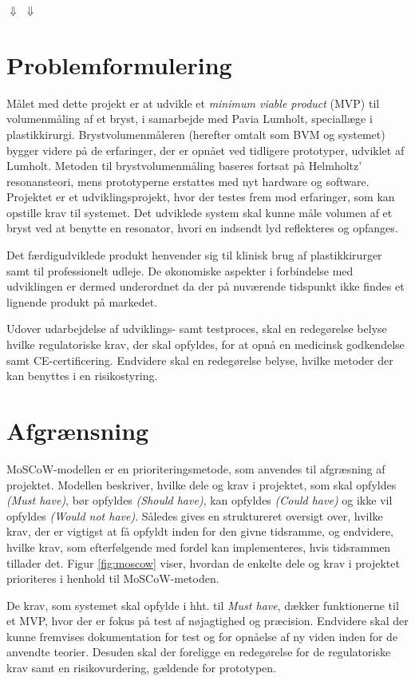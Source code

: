 \Wudl
$\Downarrow$
\Wudled
$\Downarrow$
\W
\vspace{5mm}  

\section{Problemformulering}
Målet med dette projekt er at udvikle et \textit{minimum viable product} (MVP) til volumenmåling af et bryst, i samarbejde med Pavia Lumholt, speciallæge i plastikkirurgi. Brystvolumenmåleren (herefter omtalt som BVM og systemet) bygger videre på de erfaringer, der er opnået ved tidligere prototyper, udviklet af Lumholt. Metoden til brystvolumenmåling baseres fortsat på Helmholtz' resonansteori, mens prototyperne erstattes med nyt hardware og software. Projektet er et udviklingsprojekt, hvor der testes frem mod erfaringer, som kan opstille krav til systemet. Det udviklede system skal kunne måle volumen af et bryst ved at benytte en resonator, hvori en indsendt lyd reflekteres og opfanges. 

Det færdigudviklede produkt henvender sig til klinisk brug af plastikkirurger samt til professionelt udleje. De økonomiske aspekter i forbindelse med udviklingen er dermed underordnet da der på nuværende tidspunkt ikke findes et lignende produkt på markedet.   

Udover udarbejdelse af udviklings- samt testproces, skal en redegørelse belyse hvilke regulatoriske krav, der skal opfyldes, for at opnå en medicinsk godkendelse samt CE-certificering. Endvidere skal en redegørelse belyse, hvilke metoder der kan benyttes i en risikostyring.

\section{Afgrænsning}
MoSCoW-modellen er en prioriteringsmetode, som anvendes til afgræsning af projektet. Modellen beskriver, hvilke dele og krav i projektet, som skal opfyldes \textit{(Must have)}, bør opfyldes \textit{(Should have)}, kan opfyldes \textit{(Could have)} og ikke vil opfyldes \textit{(Would not have)}. Således gives en struktureret oversigt over, hvilke krav, der er vigtigst at få opfyldt inden for den givne tidsramme, og endvidere, hvilke krav, som efterfølgende med fordel kan implementeres, hvis tidsrammen tillader det. Figur \ref{fig:moscow} viser, hvordan de enkelte dele og krav i projektet prioriteres i henhold til MoSCoW-metoden.

De krav, som systemet skal opfylde i hht. til \textit{Must have}, dækker funktionerne til et MVP, hvor der er fokus på test af nøjagtighed og præcision. Endvidere skal der kunne fremvises dokumentation for test og for opnåelse af ny viden inden for de anvendte teorier. Desuden skal der foreligge en redegørelse for de regulatoriske krav samt en risikovurdering, gældende for prototypen.

